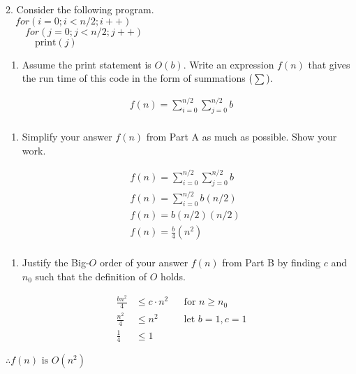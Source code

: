\documentclass[12pt]{article}
\begin{document}
\begin{flushleft}
2. Consider the following program.\\[.2in]
$\quad for(i=0;i<n/2;i++)$\\
$\qquad for(j=0;j<n/2;j++)$\\
$\quad \qquad \text{print}(j)$\\[.2in]
\end{flushleft}
\begin{enumerate}[label=A.]
\item Assume the print statement is $O(b)$. Write an expression $f(n)$ that gives the run time of this code in the form of summations ($\sum$).
\end{enumerate}
\begin{align*}
f(n)=\sum_{i=0}^{n/2} \sum_{j=0}^{n/2} b\\
\end{align*}
\begin{enumerate}[label=B.]
\item Simplify your answer $f(n)$ from Part A as much as possible. Show your work.
\end{enumerate}
\begin{align*}
&f(n)=\sum_{i=0}^{n/2} \sum_{j=0}^{n/2} b\\
&f(n)=\sum_{i=0}^{n/2} b(n/2)\\
&f(n)=b(n/2)(n/2)\\
&f(n)=\frac{b}{4}(n^2)\\
\end{align*}
\begin{enumerate}[label=C.]
\item Justify the Big-$O$ order of your answer $f(n)$ from Part B by finding $c$ and $n_{0}$ such that the definition of $O$ holds.
\end{enumerate}
\begin{align*}
\frac{bn^2}{4} &\leq c\cdot n^2 &&\text{for } n\geq n_{0}\\
\frac{n^2}{4} &\leq n^2&&\text{let } b=1,c=1\\
\frac{1}{4} &\leq 1
\end{align*}
\begin{center}
$\therefore f(n) \text{ is } O(n^2)$
\end{center}
\newpage
\end{document}
